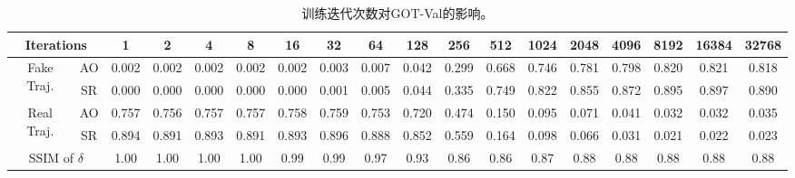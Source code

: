 \begin{table}
\centering
\footnotesize
\tabcolsep=3.0pt
\begin{tabular}{cc|cccccccccccccccc} 
\toprule
\multicolumn{2}{c|}{Iterations}     & 1     & 2     & 4     & 8     & 16    & 32    & 64    & 128   & 256   & 512   & 1024  & 2048  & 4096  & 8192  & 16384 & 32768  \\ 
\midrule
\multirow{2}{*}{Fake Traj.} & AO    & 0.002 & 0.002 & 0.002 & 0.002 & 0.002 & 0.003 & 0.007 & 0.042 & 0.299 & 0.668 & 0.746 & 0.781 & 0.798 & 0.820 & 0.821 & 0.818  \\
                                 & SR    & 0.000 & 0.000 & 0.000 & 0.000 & 0.000 & 0.001 & 0.005 & 0.044 & 0.335 & 0.749 & 0.822 & 0.855 & 0.872 & 0.895 & 0.897 & 0.890  \\ 
\midrule
\multirow{2}{*}{Real Traj.} & AO    & 0.757 & 0.756 & 0.757 & 0.757 & 0.758 & 0.759 & 0.753 & 0.720 & 0.474 & 0.150 & 0.095 & 0.071 & 0.041 & 0.032 & 0.032 & 0.035  \\
                                 & SR    & 0.894 & 0.891 & 0.893 & 0.891 & 0.893 & 0.896 & 0.888 & 0.852 & 0.559 & 0.164 & 0.098 & 0.066 & 0.031 & 0.021 & 0.022 & 0.023  \\ 
\midrule
\multicolumn{2}{c|}{SSIM of $\delta$}                        & 1.00  & 1.00  & 1.00  & 1.00  & 0.99  & 0.99  & 0.97  & 0.93  & 0.86  & 0.86  & 0.87  & 0.88  & 0.88  & 0.88  & 0.88  & 0.88   \\
\bottomrule
\end{tabular}
\caption{训练迭代次数对GOT-Val的影响。}
\label{tab:iter}
\end{table}

